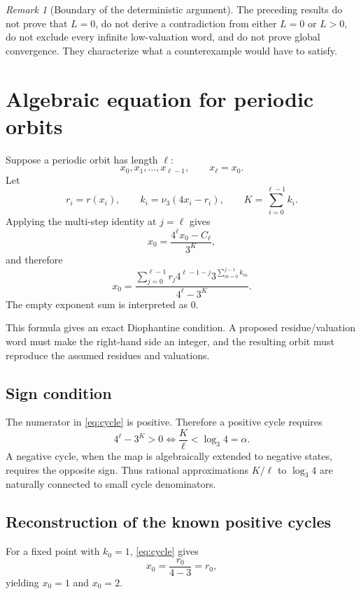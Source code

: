 \documentclass[11pt]{article}
\theoremstyle{definition}
\theoremstyle{remark}
\newtheorem{remark}[theorem]{Remark}
\newcommand{\vthree}{\nu_3}
\begin{document}
\begin{remark}[Boundary of the deterministic argument]
The preceding results do not prove that $L=0$, do not derive a contradiction from either $L=0$ or $L>0$, do not exclude every infinite low-valuation word, and do not prove global convergence.  They characterize what a counterexample would have to satisfy.
\end{remark}

\section{Algebraic equation for periodic orbits}

Suppose a periodic orbit has length $\ell$:
\[
x_0,x_1,\ldots,x_{\ell-1},\qquad x_\ell=x_0.
\]
Let
\[
r_i=r(x_i),\qquad
k_i=\vthree(4x_i-r_i),
\qquad
K=\sum_{i=0}^{\ell-1}k_i.
\]
Applying the multi-step identity at $j=\ell$ gives
\[
x_0=\frac{4^\ell x_0-C_\ell}{3^K},
\]
and therefore
\begin{equation}
\boxed{
x_0=
\frac{\displaystyle
\sum_{j=0}^{\ell-1}
r_j4^{\ell-1-j}
3^{\sum_{m=0}^{j-1}k_m}}
{4^\ell-3^K}.
}
\label{eq:cycle}
\end{equation}
The empty exponent sum is interpreted as $0$.

This formula gives an exact Diophantine condition.  A proposed residue/valuation word must make the right-hand side an integer, and the resulting orbit must reproduce the assumed residues and valuations.

\subsection{Sign condition}

The numerator in \eqref{eq:cycle} is positive.  Therefore a positive cycle requires
\begin{equation}
4^\ell-3^K>0
\iff
\frac K\ell<\log_3 4=\alpha.
\label{eq:positive-cycle}
\end{equation}
A negative cycle, when the map is algebraically extended to negative states, requires the opposite sign.  Thus rational approximations $K/\ell$ to $\log_3 4$ are naturally connected to small cycle denominators.

\subsection{Reconstruction of the known positive cycles}

For a fixed point with $k_0=1$, \eqref{eq:cycle} gives
\[
x_0=\frac{r_0}{4-3}=r_0,
\]
yielding $x_0=1$ and $x_0=2$.
\end{document}
